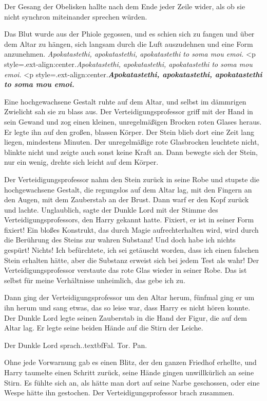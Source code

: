 Der Gesang der Obelisken hallte nach dem Ende jeder Zeile wider, als ob sie
nicht synchron miteinander sprechen würden.

Das Blut wurde aus der Phiole gegossen, und es schien sich zu fangen und über
dem Altar zu hängen, sich langsam durch die Luft auszudehnen und eine Form
anzunehmen.  \emph{Apokatastethi,
apokatastethi, apokatastethi to soma mou emoi.}   <p
style=\grqq{}.ext-align:center\grqq{}.\emph{Apokatastethi, apokatastethi,
apokatastethi to soma mou emoi.}   <p
style=\grqq{}.ext-align:center\grqq{}.\textbf{\emph{Apokatastethi,
apokatastethi, apokatastethi to soma mou emoi.} }

Eine hochgewachsene Gestalt ruhte auf dem Altar, und selbst im dämmrigen
Zwielicht sah sie zu blass aus. Der Verteidigungsprofessor griff mit der Hand in
sein Gewand und zog einen kleinen, unregelmäßigen Brocken roten Glases heraus.
Er legte ihn auf den großen, blassen Körper. Der Stein blieb dort eine Zeit lang
liegen, mindestens Minuten. Der unregelmäßige rote Glasbrocken leuchtete nicht,
blinkte nicht und zeigte auch sonst keine Kraft an. Dann bewegte sich der Stein,
nur ein wenig, drehte sich leicht auf dem Körper.

Der Verteidigungsprofessor nahm den Stein zurück in seine Robe und stupste die
hochgewachsene Gestalt, die regungslos auf dem Altar lag, mit den Fingern an den
Augen, mit dem Zauberstab an der Brust. Dann warf er den Kopf zurück und lachte.
\glqq{}Unglaublich\grqq{}, sagte der Dunkle Lord mit der Stimme des
Verteidigungsprofessors, den Harry gekannt hatte. \glqq{}Fixiert, er ist in
seiner Form fixiert! Ein bloßes Konstrukt, das durch Magie aufrechterhalten
wird, wird durch die Berührung des Steins zur wahren Substanz! Und doch habe ich
nichts gespürt! Nichts! Ich befürchtete, ich sei getäuscht worden, dass ich
einen falschen Stein erhalten hätte, aber die Substanz erweist sich bei jedem
Test als wahr!\grqq{} Der Verteidigungsprofessor verstaute das rote Glas wieder
in seiner Robe. \glqq{}Das ist selbst für meine Verhältnisse unheimlich, das gebe
ich zu.\grqq{}

Dann ging der Verteidigungsprofessor um den Altar herum, fünfmal ging er um ihn
herum und sang etwas, das so leise war, dass Harry es nicht hören konnte. Der
Dunkle Lord legte seinen Zauberstab in die Hand der Figur, die auf dem Altar
lag. Er legte seine beiden Hände auf die Stirn der Leiche.

Der Dunkle Lord sprach.\grqq{}.textbf{Fal. Tor. Pan}.\grqq{}

Ohne jede Vorwarnung gab es einen Blitz, der den ganzen Friedhof erhellte, und
Harry taumelte einen Schritt zurück, seine Hände gingen unwillkürlich an seine
Stirn. Es fühlte sich an, als hätte man dort auf seine Narbe geschossen, oder
eine Wespe hätte ihn gestochen. Der Verteidigungsprofessor brach zusammen.


